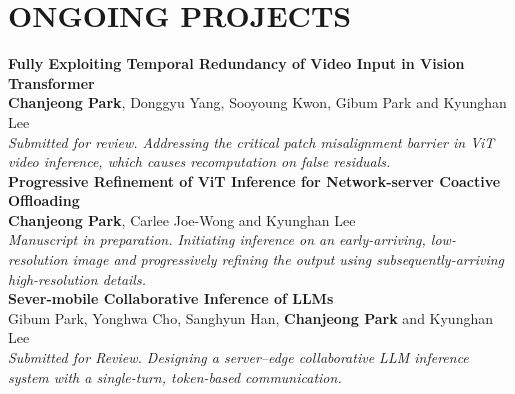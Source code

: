 \section*{ONGOING PROJECTS}

\noindent
\textbf{Fully Exploiting Temporal Redundancy of Video Input in Vision Transformer}\\
\textbf{Chanjeong Park}, Donggyu Yang, Sooyoung Kwon, Gibum Park and Kyunghan Lee \\[3pt]
\textit{Submitted for review. Addressing the critical patch misalignment barrier in ViT video inference, which causes recomputation on false residuals.} \\

\noindent
\textbf{Progressive Refinement of ViT Inference for Network-server Coactive Offloading} \\
\textbf{Chanjeong Park}, Carlee Joe-Wong and Kyunghan Lee \\[3pt]
\textit{Manuscript in preparation. Initiating inference on an early-arriving, low-resolution image and progressively refining the output using subsequently-arriving high-resolution details.} \\

\noindent
\textbf{Sever-mobile Collaborative Inference of LLMs} \\
Gibum Park, Yonghwa Cho, Sanghyun Han, \textbf{Chanjeong Park} and Kyunghan Lee \\[3pt]
\textit{Submitted for Review. Designing a server–edge collaborative LLM inference system with a single-turn, token-based communication.}
